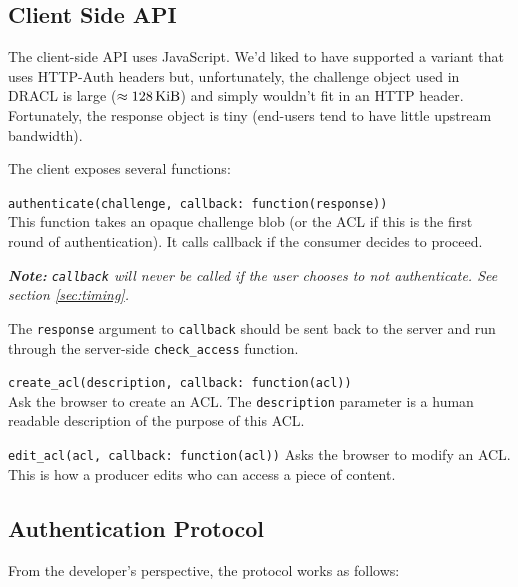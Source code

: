 \documentclass[pdftex,12pt,a4papaer,twoside,notitlepage]{report}
\newcommand{\note}[1]{\vspace{1em} \begin{spacing}{1}\textit{\textbf{Note:} #1}\end{spacing}\vspace{1em}}
\begin{document}
\subsection{Client Side API}

The client-side API uses JavaScript. We'd liked to have supported a variant that
uses HTTP-Auth headers but, unfortunately, the challenge object used in DRACL is
large ($\approx\unit[128]{KiB}$) and simply wouldn't fit in an HTTP header.
Fortunately, the response object is tiny (end-users tend to have little upstream
bandwidth).

The client exposes several functions:

\begin{compactitem}[$\lambda$]
\item \verb=authenticate(challenge, callback: function(response))= \\
  This function takes an opaque challenge blob (or the ACL if this is the first
  round of authentication). It calls callback if the consumer decides to
  proceed.

  \note{\texttt{callback} will never be called if the user chooses to not
    authenticate. See section \cref{sec:timing}.}

  The \texttt{response} argument to \texttt{callback} should be sent back to the
  server and run through the server-side \texttt{check\_access} function.
\item \verb=create_acl(description, callback: function(acl))= \\
  Ask the browser to create an ACL. The \texttt{description} parameter is a human
  readable description of the purpose of this ACL.
\item \verb=edit_acl(acl, callback: function(acl))=
  Asks the browser to modify an ACL. This is how a producer edits who can access
  a piece of content.
\end{compactitem}

\subsection{Authentication Protocol}

From the developer's perspective, the protocol works as follows:

\newcommand{\server}{\underline{\texttt{server}}}
\newcommand{\client}{\underline{\texttt{client}}}
\end{document}
